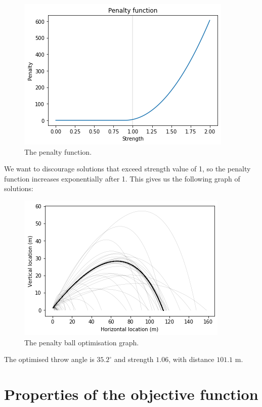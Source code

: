 \documentclass[a4paper, openany]{memoir}
\begin{document}
\begin{figure}[H]
    \centering
    \includegraphics[scale=0.6]{src/4.5 penalty function.png}
    \caption{The penalty function.}
\end{figure}
\noindent We want to discourage solutions that exceed strength value of 1, so the penalty function increases exponentially after 1. This gives us the following graph of solutions:
\begin{figure}[H]
    \centering
    \includegraphics[scale=0.7]{src/4.6 penalty ball optimisation.png}
    \caption{The penalty ball optimisation graph.}
\end{figure}
\noindent The optimised throw angle is $35.2^{\circ}$ and strength $1.06$, with distance $101.1$ m.

\section{Properties of the objective function}
\end{document}
